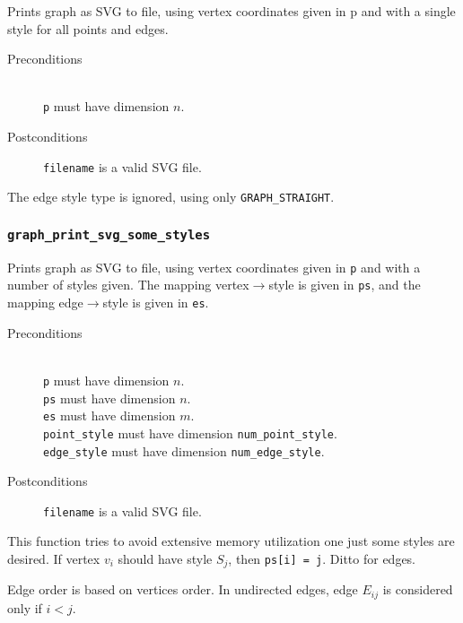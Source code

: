 \documentclass[a4paper,10pt]{article}
\begin{document}
Prints graph as SVG to file, using vertex coordinates given in p and with a 
single style for all points and edges.

\begin{description}
 \item[Preconditions]~\\
   \texttt{p} must have dimension $n$.
 \item[Postconditions]
   \texttt{filename} is a valid SVG file.
\end{description}

The edge style type is ignored, using only \texttt{GRAPH\_STRAIGHT}.

\subsubsection{\texttt{graph\_print\_svg\_some\_styles}}

Prints graph as SVG to file, using vertex coordinates given in \texttt{p} and
with a number of styles given. The mapping vertex$\to$style is given in \texttt{ps},
and the mapping edge$\to$style is given in \texttt{es}.

\begin{description}
 \item[Preconditions]~\\
   \texttt{p} must have dimension $n$.\\
   \texttt{ps} must have dimension $n$.\\
   \texttt{es} must have dimension $m$.\\
   \texttt{point\_style} must have dimension \texttt{num\_point\_style}.\\
   \texttt{edge\_style} must have dimension \texttt{num\_edge\_style}.
 \item[Postconditions]
   \texttt{filename} is a valid SVG file.
\end{description}

This function tries to avoid extensive memory utilization one just some 
styles are desired. If vertex $v_i$ should have style $S_j$, then 
\texttt{ps[i] = j}. Ditto for edges.

Edge order is based on vertices order. In undirected edges, edge $E_{ij}$ 
is considered only if $i < j$.
\end{document}
